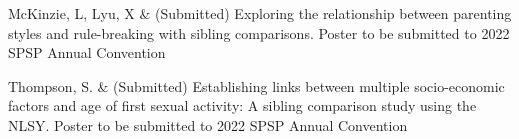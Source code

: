 
\item McKinzie, L, Lyu, X \& \meb (Submitted) Exploring the relationship between parenting styles and rule-breaking with sibling comparisons. Poster to be submitted to 2022 SPSP Annual Convention
\item Thompson, S. \& \meb (Submitted) Establishing links between multiple socio-economic factors and age of first sexual activity: A sibling comparison study using the NLSY. Poster to be submitted to 2022 SPSP Annual Convention
